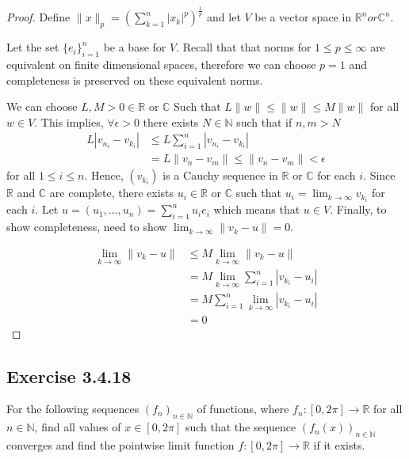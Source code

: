 \documentclass{tufte-book}
\theoremstyle{mytheoremstyle}
\theoremstyle{mylemstyle}
\theoremstyle{mydefstyle}
\begin{document}
\begin{proof}
Define $\|x\|_p = (\sum_{k=1}^n |x_k|^p)^\frac{1}{p}$ and let $V$ be a vector space in $\mathbb{R}^n or \mathbb{C}^n$.

Let the set $\{e_i\}_{i=1}^n$ be a base for $V$.  Recall that that norms for $1 \leq p \leq \infty$ are equivalent on finite dimensional spaces, therefore we can choose $p=1$ and completeness is preserved on these equivalent norms.

We can choose $L,M>0 \in \mathbb{R}$ or $\mathbb{C}$ Such that $L\|w\| \leq \|w\| \leq M\|w\|$ for all $w \in V$.  This implies, $\forall \epsilon >0$ there exists $N \in \mathbb{N}$ such that if $n,m > N$
\begin{align*}
L|v_{n_{i}} - v_{k_{i}}| &\leq L \sum_{i=1}^n|v_{n_{i}} - v_{k_{i}}|\\
&= L\|v_n - v_m\| \leq \|v_n - v_m\|< \epsilon
\end{align*}
for all $1 \leq i \leq n$.  Hence, $(v_{k_{i}})$ is a Cauchy sequence in $\mathbb{R}$ or $\mathbb{C}$ for each $i$.  Since $\mathbb{R}$ and $\mathbb{C}$ are complete, there exists $u_i \in \mathbb{R}$ or $\mathbb{C}$ such that $u_i = \lim_{k \to \infty}v_{k_{i}}$ for each $i$.
Let $u=(u_1,...,u_n) = \sum_{i=1}^n u_ie_i$ which means that $u \in V$.  Finally, to show completeness, need to show $\lim_{k \to \infty}\|v_k - u\| = 0$.

\begin{align*}
\lim_{k \to \infty}\|v_k - u\| &\leq M \lim_{k \to \infty}\|v_k - u\|\\
&= M \lim_{k \to \infty} \sum_{i=1}^n|v_{k_{i}} - u_i| \\
&= M \sum_{i=1}^n \lim_{k \to \infty} |v_{k_{i}} - u_i| \\
&= 0
\end{align*}

\end{proof}

\subsection{Exercise 3.4.18}
For the following sequences $(f_n)_{n \in \mathbb{N}}$ of functions, where $f_n:[0,2\pi] \rightarrow \mathbb{R}$ for all $n \in \mathbb{N}$, find all values of $x \in [0, 2\pi]$ such that the sequence $(f_n(x))_{n \in \mathbb{N}}$ converges and find the pointwise limit function $f: [0,2\pi] \rightarrow \mathbb{R}$ if it exists.
\end{document}
